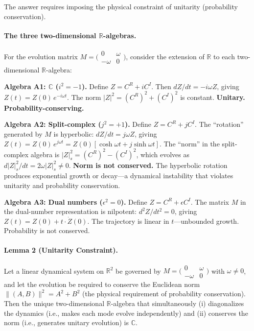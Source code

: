 \documentclass[aps,pra,preprint,groupedaddress,amsmath,amssymb,floatfix]{revtex4-2}
\begin{document}
The answer requires imposing the physical constraint of unitarity (probability conservation).

\paragraph{The three two-dimensional $\mathbb{R}$-algebras.} For the evolution matrix $M = \bigl(\begin{smallmatrix}0 & \omega \\ -\omega & 0\end{smallmatrix}\bigr)$, consider the extension of $\mathbb{R}$ to each two-dimensional $\mathbb{R}$-algebra:

\textbf{Algebra A1: $\mathbb{C}$ ($i^2 = -1$).} Define $Z = C^R + iC^I$. Then $dZ/dt = -i\omega Z$, giving $Z(t) = Z(0)\,e^{-i\omega t}$. The norm $|Z|^2 = (C^R)^2 + (C^I)^2$ is constant. \textbf{Unitary. Probability-conserving.}

\textbf{Algebra A2: Split-complex ($j^2 = +1$).} Define $Z = C^R + jC^I$. The ``rotation'' generated by $M$ is hyperbolic: $dZ/dt = j\omega Z$, giving $Z(t) = Z(0)\,e^{j\omega t} = Z(0)[\cosh\omega t + j\sinh\omega t]$. The ``norm'' in the split-complex algebra is $|Z|_s^2 = (C^R)^2 - (C^I)^2$, which evolves as $d|Z|_s^2/dt = 2\omega|Z|_s^2 \neq 0$. \textbf{Norm is not conserved.} The hyperbolic rotation produces exponential growth or decay---a dynamical instability that violates unitarity and probability conservation.

\textbf{Algebra A3: Dual numbers ($\epsilon^2 = 0$).} Define $Z = C^R + \epsilon C^I$. The matrix $M$ in the dual-number representation is nilpotent: $d^2Z/dt^2 = 0$, giving $Z(t) = Z(0) + t\cdot\dot Z(0)$. The trajectory is linear in $t$---unbounded growth. Probability is not conserved.

\paragraph{Lemma 2 (Unitarity Constraint).} Let a linear dynamical system on $\mathbb{R}^2$ be governed by $M = \bigl(\begin{smallmatrix}0 & \omega \\ -\omega & 0\end{smallmatrix}\bigr)$ with $\omega \neq 0$, and let the evolution be required to conserve the Euclidean norm $\|(A,B)\|^2 = A^2 + B^2$ (the physical requirement of probability conservation). Then the unique two-dimensional $\mathbb{R}$-algebra that simultaneously (i) diagonalizes the dynamics (i.e., makes each mode evolve independently) and (ii) conserves the norm (i.e., generates unitary evolution) is $\mathbb{C}$.
\end{document}
